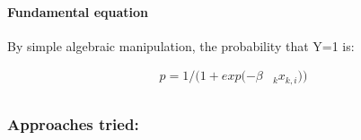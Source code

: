 \documentclass[11pt]{article}
\begin{document}
    \hypertarget{fundamental-equation}{%
\paragraph{Fundamental equation}\label{fundamental-equation}}

    By simple algebraic manipulation, the probability that Y=1 is:

    \begin{align}
p = 1 / (1 + exp (-{\beta} & _k x _{k,i})  )            \\
\end{align}

    \hypertarget{approaches-tried}{%
\subsubsection{Approaches tried:}\label{approaches-tried}}
\end{document}
